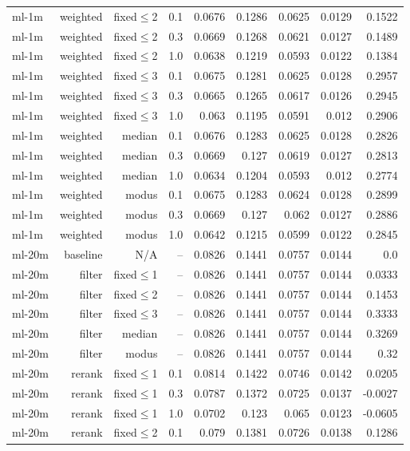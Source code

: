 \begin{longtable}{lrrrrrrrr}
ml-1m & weighted & fixed$\leq$2 & 0.1 & 0.0676 & 0.1286 & 0.0625 & 0.0129 & 0.1522 \\
ml-1m & weighted & fixed$\leq$2 & 0.3 & 0.0669 & 0.1268 & 0.0621 & 0.0127 & 0.1489 \\
ml-1m & weighted & fixed$\leq$2 & 1.0 & 0.0638 & 0.1219 & 0.0593 & 0.0122 & 0.1384 \\
ml-1m & weighted & fixed$\leq$3 & 0.1 & 0.0675 & 0.1281 & 0.0625 & 0.0128 & 0.2957 \\
ml-1m & weighted & fixed$\leq$3 & 0.3 & 0.0665 & 0.1265 & 0.0617 & 0.0126 & 0.2945 \\
ml-1m & weighted & fixed$\leq$3 & 1.0 & 0.063 & 0.1195 & 0.0591 & 0.012 & 0.2906 \\
ml-1m & weighted & median & 0.1 & 0.0676 & 0.1283 & 0.0625 & 0.0128 & 0.2826 \\
ml-1m & weighted & median & 0.3 & 0.0669 & 0.127 & 0.0619 & 0.0127 & 0.2813 \\
ml-1m & weighted & median & 1.0 & 0.0634 & 0.1204 & 0.0593 & 0.012 & 0.2774 \\
ml-1m & weighted & modus & 0.1 & 0.0675 & 0.1283 & 0.0624 & 0.0128 & 0.2899 \\
ml-1m & weighted & modus & 0.3 & 0.0669 & 0.127 & 0.062 & 0.0127 & 0.2886 \\
ml-1m & weighted & modus & 1.0 & 0.0642 & 0.1215 & 0.0599 & 0.0122 & 0.2845 \\
ml-20m & baseline & N/A & -- & 0.0826 & 0.1441 & 0.0757 & 0.0144 & 0.0 \\
ml-20m & filter & fixed$\leq$1 & -- & 0.0826 & 0.1441 & 0.0757 & 0.0144 & 0.0333 \\
ml-20m & filter & fixed$\leq$2 & -- & 0.0826 & 0.1441 & 0.0757 & 0.0144 & 0.1453 \\
ml-20m & filter & fixed$\leq$3 & -- & 0.0826 & 0.1441 & 0.0757 & 0.0144 & 0.3333 \\
ml-20m & filter & median & -- & 0.0826 & 0.1441 & 0.0757 & 0.0144 & 0.3269 \\
ml-20m & filter & modus & -- & 0.0826 & 0.1441 & 0.0757 & 0.0144 & 0.32 \\
ml-20m & rerank & fixed$\leq$1 & 0.1 & 0.0814 & 0.1422 & 0.0746 & 0.0142 & 0.0205 \\
ml-20m & rerank & fixed$\leq$1 & 0.3 & 0.0787 & 0.1372 & 0.0725 & 0.0137 & -0.0027 \\
ml-20m & rerank & fixed$\leq$1 & 1.0 & 0.0702 & 0.123 & 0.065 & 0.0123 & -0.0605 \\
ml-20m & rerank & fixed$\leq$2 & 0.1 & 0.079 & 0.1381 & 0.0726 & 0.0138 & 0.1286 \\

\end{longtable}
